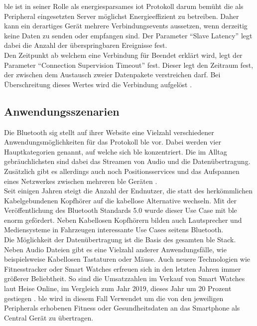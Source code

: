 \noindent \ac{ble} ist in seiner Rolle als energiesparsames \ac{iot} Protokoll darum bemüht die als Peripheral eingesetzten Server möglichst Energieeffizient zu betreiben. Daher kann ein derartiges Gerät mehrere Verbindungsevents aussetzen, wenn derzeitig keine Daten zu senden oder empfangen sind. Der Parameter "`Slave Latency"' legt dabei die Anzahl der überspringbaren Ereignisse fest.\\

\noindent Den Zeitpunkt ab welchem eine Verbindung für Beendet erklärt wird, legt der Parameter "`Connection Supervision Timeout"' fest. Dieser legt den Zeitraum fest, der zwischen dem Austausch zweier Datenpakete verstreichen darf. Bei Überschreitung dieses Wertes wird die Verbindung aufgelöst \cite[Seite 22f]{Townsend14:GSB}.\\

\subsection{Anwendungsszenarien}
\label{ss:funktionsweise:anwendungen}

\noindent Die Bluetooth \ac{sig} stellt auf ihrer Website eine Vielzahl verschiedener Anwendungsmöglichkeiten für das Protokoll \ac{ble} vor. Dabei werden vier Hauptkategorien genannt, auf welche sich \ac{ble} konzentriert. Die im Alltag gebräuchlichsten sind dabei das Streamen von Audio und die Datenübertragung. Zusätzlich gibt es allerdings auch noch Positionsservices und das Aufspannen eines Netzwerkes zwischen mehreren \ac{ble} Geräten \cite{BLU:WWW}.\\

\noindent Seit einigen Jahren steigt die Anzahl der Endnutzer, die statt des herkömmlichen Kabelgebundenen Kopfhörer auf die kabellose Alternative wechseln. Mit der Veröffentlichung des Bluetooth Standards 5.0 wurde dieser Use Case mit \ac{ble} enorm gefördert. Neben Kabellosen Kopfhörern bilden auch Lautsprecher und Mediensysteme in Fahrzeugen interessante Use Cases seitens Bluetooth.\\

\noindent Die Möglichkeit der Datenübertragung ist die Basis des gesamten \ac{ble} Stack. Neben Audio Dateien gibt es eine Vielzahl anderer Anwendungsfälle, wie beispielsweise Kabellosen Tastaturen oder Mäuse. Auch neuere Technologien wie Fitnesstracker oder Smart Watches erfreuen sich in den letzten Jahren immer größerer Beliebtheit. So sind die Umsatzzahlen im Verkauf von Smart Watches laut Heise Online, im Vergleich zum Jahr 2019, dieses Jahr um 20 Prozent gestiegen \cite{HEI:WWW}. \ac{ble} wird in diesem Fall Verwendet um die von den jeweiligen Peripherals erhobenen Fitness oder Gesundheitsdaten an das Smartphone als Central Gerät zu übertragen.\\

